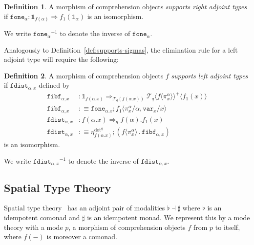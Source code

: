 \documentclass[10pt]{article}
\theoremstyle{definition}
\newtheorem{definition}{Definition}
\let\emptyset\varnothing
\newcommand{\tcell}{\Rightarrow}
\newcommand\TrPlus[2]{\ensuremath{{#1}^+(#2)}}
\newcommand\El[2]{\mathcal{T}_{#1}(#2)}
\newcommand\ApEl[2]{\mathcal{T}_{#1}\langle#2\rangle}
\newcommand\bdot[0]{\mathbin{.}}
\newcommand\ap[2]{\ensuremath{#1 \langle #2 \rangle }}
\newcommand\ApPlus[2]{\ensuremath{{#1}^+ \langle #2 \rangle }}
\newcommand{\sdot}{\ensuremath{\mathrm{dot}}}
\newcommand\One{\ensuremath{\mathds{1}}}
\newcommand\var[1]{\ensuremath{\mathtt{var}_{#1}}}
\newcommand\fone[1]{\ensuremath{\mathtt{fone}_{#1}}}
\newcommand\fibf[1]{\ensuremath{\mathtt{fibf}_{#1}}}
\newcommand\foneinv[1]{\ensuremath{\fone{#1}^{-1}}}
\newcommand\fdist[1]{\ensuremath{\mathtt{fdist}_{#1}}}
\newcommand\fdistinv[1]{\ensuremath{\fdist{#1}^{-1}}}
\begin{document}
\begin{definition} \label{def:supports-right-adjoint}
A morphism of comprehension objects \emph{supports right adjoint types}
if $\fone{\alpha} : \One_{f(\alpha)} \tcell f_1(\One_\alpha)$ is an isomorphism.
\end{definition}
We write $\foneinv{\alpha}$ to denote the inverse of $\fone{\alpha}$.

Analogously to Definition~\ref{def:supports-sigmas}, the elimination
rule for a left adjoint type will require the following:

\begin{definition} \label{def:supports-left}
A morphism of comprehension objects $f$ \emph{supports left adjoint types} if $\fdist{\alpha, x}$ defined by
\begin{align*}
\fibf{\alpha, x} &: \One_{f(\alpha.x)} \tcell_{\El{q}{f(\alpha.x)}} \ApPlus{\ApEl{q}{\ap{f}{\pi^\alpha_x}}}{f_1(x)} \\
\fibf{\alpha, x} &:\equiv \fone{\alpha.x};\ap{f_1}{\pi^\alpha_x/\alpha, \var{x}/x} \\
\fdist{\alpha, x} &: f(\alpha.x) \tcell_q f(\alpha).f_1(x) \\
\fdist{\alpha, x} &:\equiv \eta^{\sdot^q}_{f(\alpha.x)} ; (\ap{f}{\pi^\alpha_x} \bdot \fibf{\alpha, x})
\end{align*}
is an isomorphism.
\end{definition}
We write $\fdistinv{\alpha,x}$ to denote the inverse of $\fdist{\alpha,x}$.


\subsection{Spatial Type Theory}

Spatial type theory~\citep{shulman15realcohesion} has an adjoint pair of
modalities $\flat \dashv \sharp$ where $\flat$ is an idempotent comonad
and $\sharp$ is an idempotent monad.  We represent this by a mode theory
with a mode $p$, a morphism of comprehension objects $f$ from $p$ to
itself, where $f(-)$ is moreover a comonad.
\end{document}
